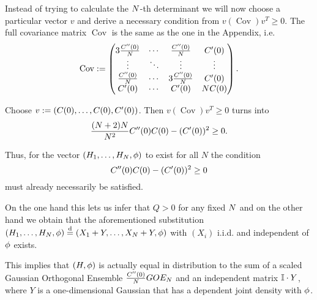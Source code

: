 Instead of trying to calculate the $N$-th determinant we will now choose a particular vector $v$ and derive a necessary condition from $v (\operatorname{Cov}) v^T \geq 0$. The full covariance matrix $\operatorname{Cov}$ is the same as the one in the Appendix, i.e.
\begin{align*}
    \operatorname{Cov} := 
    \begin{pmatrix}
		3\frac{C''(0)}{N} &  \cdots & \frac{C''(0)}{N}
		& C'(0) \\
		\vdots & \ddots &\vdots & \vdots \\
		\frac{C''(0)}{N} & \cdots &  3 \frac{C''(0)}{N} & C'(0)\\
		C'(0)	& \cdots & C'(0) & N C(0)
	\end{pmatrix}.
\end{align*}

Choose $v := (C(0), \ldots, C(0), C'(0))$. Then $v (\operatorname{Cov}) v^T \geq 0$ turns into
\begin{align*}
    \frac{(N+2)N}{N^2} C''(0)C(0) - (C'(0))^2 \geq 0.
\end{align*}

Thus, for the vector $(H_1, \ldots, H_N, \phi)$ to exist for all $N$ the condition 
$$C''(0)C(0) - (C'(0))^2 \geq 0$$
must already necessarily be satisfied.

On the one hand this lets us infer that $Q > 0$ for any fixed $N$ and on the other hand we obtain that the aforementioned substitution $(H_1, \ldots, H_N,\phi) \overset{\text{d}}{=} (X_1 + Y, \ldots, X_N + Y,\phi)$ with $(X_i)$ i.i.d. and independent of $\phi$ exists.

This implies that $(H,\phi)$ is actually equal in distribution to the sum of a scaled Gaussian Orthogonal Ensemble $\frac{C''(0)}{N} GOE_N$ and an independent matrix $\mathbb{I} \cdot Y$, where $Y$ is a one-dimensional Gaussian that has a dependent joint density with $\phi$.